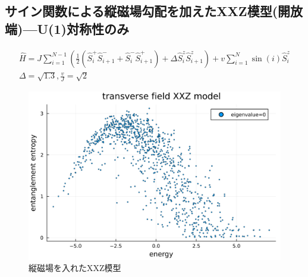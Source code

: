 \documentclass{ltjsarticle}
\begin{document}
\subsection*{サイン関数による縦磁場勾配を加えたXXZ模型(開放端)—U(1)対称性のみ}
\begin{gather}
  \hat{H}=J\sum_{i=1}^{N-1} \left(\frac{1}{2}(\hat{S}_i^+\hat{S}_{i+1}^- + \hat{S}_i^-\hat{S}_{i+1}^+) + \Delta\hat{S}_i^z\hat{S}_{i+1}^z\right) + v\sum_{i=1}^{N} \sin(i)\hat{S}_i^z\\
  \Delta=\sqrt{1.3},\frac{v}{J}=\sqrt{2}
\end{gather}
\begin{figure}[H]
  \centering
  \includegraphics[width=150mm]{entropy_xxz.png}
  \caption{縦磁場を入れたXXZ模型}
  \label{fig:entropy_xxz}
\end{figure}
\end{document}
